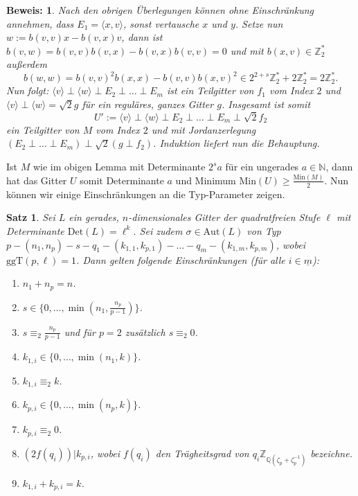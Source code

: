 \documentclass[12pt,a4paper,halfparskip,headsepline,bibtotocnumbered]{scrreprt}
\theoremstyle{nummermitklammern}
\newtheorem{satz}[defsatzusw]{Satz}
\theoremstyle{nonumberbreak}
\newtheorem{beweis}{Beweis:}
\newcommand{\N}{\mathbb{N}}
\newcommand{\Z}{\mathbb{Z}}
\newcommand{\Q}{\mathbb{Q}}
\newcommand{\Det}{\text{Det}}
\newcommand{\Min}{\text{Min}}
\newcommand{\ggT}{\text{ggT}}
\newcommand{\Aut}{\text{Aut}}
\begin{document}
\begin{beweis}
	Nach den obrigen Überlegungen können ohne Einschränkung annehmen, dass\linebreak
	$E_1 = \langle x,v \rangle$, sonst vertausche $x$ und $y$. Setze nun $w := b(v,v) x - b(v,x) v$, dann ist $b(v,w) = b(v,v) b(v,x) - b(v,x) b(v,v) = 0$ und mit $b(x,v) \in \Z_2^\ast$ außerdem 	\begin{equation*}
		b(w,w) = b(v,v)^2 b(x,x) - b(v,v) b(x,v)^2 \in 2^{2+s} \Z_2^\ast + 2 \Z_2^\ast = 2 \Z_2^\ast.
	\end{equation*}
	Nun folgt: $\langle v \rangle \perp  \langle w \rangle \perp E_2 \perp \dots \perp E_m$ ist ein Teilgitter von $f_1$ vom Index $2$ und
	$\langle v \rangle \perp \langle w \rangle = \sqrt{2} g$ für ein reguläres, ganzes Gitter $g$. Insgesamt ist somit
	\begin{equation*}
		U' := \langle v \rangle \perp \langle w \rangle \perp E_2 \perp \dots \perp E_m \perp \sqrt{2}f_2
	\end{equation*}
	ein Teilgitter von $M$ vom Index $2$ und mit Jordanzerlegung $\left( E_2 \perp \dots \perp E_m \right) \perp \sqrt{2} \left( g \perp f_2 \right)$. Induktion liefert nun die Behauptung.
\end{beweis}

Ist $M$ wie im obigen Lemma mit Determinante $2^s a$ für ein ungerades $a \in \N$, dann hat das Gitter $U$ somit Determinante $a$ und Minimum $\Min(U) \geq \frac{\Min(M)}{2}$.
Nun können wir einige Einschränkungen an die Typ-Parameter zeigen.

\begin{framed}
	\begin{satz} \label{th:restrict}
		Sei $L$ ein gerades, $n$-dimensionales Gitter der quadratfreien Stufe $\ell$ mit Determinante $\Det(L) = \ell^k$. Sei zudem $\sigma \in \Aut(L)$ von Typ $p - (n_1, n_p) - s - q_1 - (k_{1,1}, k_{p,1}) - \dots - q_m - (k_{1,m}, k_{p,m})$, wobei $\ggT(p, \ell) = 1$. Dann gelten folgende Einschränkungen (für alle $i \in \underline{m}$):
		\begin{enumerate}[label=(\roman*)]
			\item $n_1 + n_p = n$.
			\item $s \in \lbrace 0, \dots, \min(n_1, \frac{n_p}{p-1}) \rbrace$.
			\item $s \equiv_2 \frac{n_p}{p-1}$ und für $p = 2$ zusätzlich $s \equiv_2 0$.
			\item $k_{1,i} \in \lbrace 0, \dots, \min(n_1, k) \rbrace$.
			\item $k_{1,i} \equiv_2 k$.
			\item $k_{p,i} \in \lbrace 0, \dots, \min(n_p, k) \rbrace$.
			\item $k_{p,i} \equiv_2 0$.
			\item $\left( 2f(q_i)\right) \vert k_{p,i}$, wobei $f(q_i)$ den Trägheitsgrad von $q_i \Z_{\Q(\zeta_p + \zeta_p^{-1})}$ bezeichne.
			\item $k_{1,i} + k_{p,i} = k$.
		\end{enumerate}
	\end{satz}
\end{framed}
\end{document}
